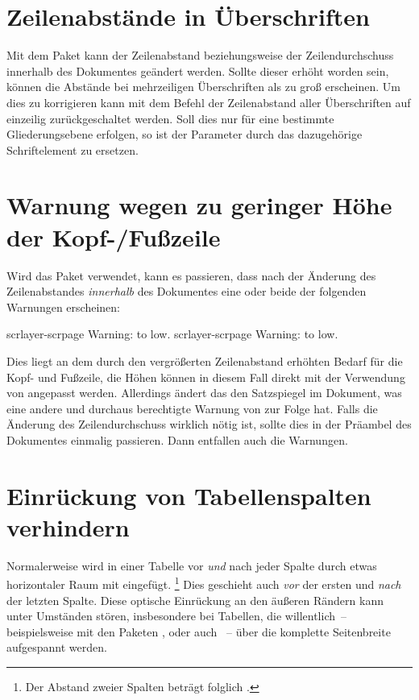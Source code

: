 \section{%
  Zeilenabstände in Überschriften%
  \label{sec:tips:headings}%
}
%
Mit dem Paket  kann der Zeilenabstand beziehungsweise der 
Zeilendurchschuss innerhalb des Dokumentes geändert werden. Sollte dieser 
erhöht worden sein, können die Abstände bei mehrzeiligen Überschriften als zu 
groß erscheinen. Um dies zu korrigieren kann mit dem Befehl 
der Zeilenabstand aller Überschriften auf einzeilig zurückgeschaltet werden. 
Soll dies nur für eine bestimmte Gliederungsebene erfolgen, so ist der 
Parameter  durch das dazugehörige Schriftelement zu 
ersetzen.



\section{%
  Warnung wegen zu geringer Höhe der Kopf-/Fußzeile%
  \label{sec:tips:headline}%
}
%
Wird das Paket  verwendet, kann es passieren, dass nach der 
Änderung des Zeilenabstandes \emph{innerhalb} des Dokumentes eine oder beide 
der folgenden Warnungen erscheinen:
%
\begin{quoting}
\begin{Code}
scrlayer-scrpage Warning: \headheight to low.
scrlayer-scrpage Warning: \footheight to low.
\end{Code}
\end{quoting}
%
Dies liegt an dem durch den vergrößerten Zeilenabstand erhöhten Bedarf für die
Kopf- und Fußzeile, die Höhen können in diesem Fall direkt mit der Verwendung 
von  angepasst werden. Allerdings ändert das den 
Satzspiegel im Dokument, was eine andere und durchaus berechtigte Warnung von 
 zur Folge hat. Falls die Änderung des Zeilendurchschuss 
wirklich nötig ist, sollte dies in der Präambel des Dokumentes einmalig 
passieren. Dann entfallen auch die Warnungen.



\section{%
  Einrückung von Tabellenspalten verhindern%
  \label{sec:tips:table}%
}
%
Normalerweise wird in einer Tabelle vor \emph{und} nach jeder Spalte durch 
 etwas horizontaler Raum mit  
eingefügt.%
\footnote{%
  Der Abstand zweier Spalten beträgt folglich .%
}
Dies geschieht auch \emph{vor} der ersten und \emph{nach} der letzten Spalte. 
Diese optische Einrückung an den äußeren Rändern kann unter Umständen stören, 
insbesondere bei Tabellen, die willentlich~-- beispielsweise mit den Paketen 
,  oder auch ~-- über die 
komplette Seitenbreite aufgespannt werden.

